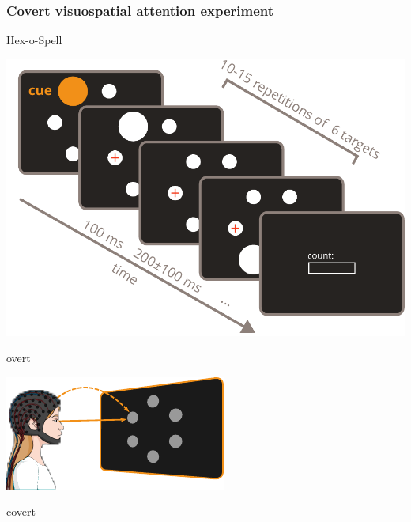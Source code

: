 \documentclass{kul-ulille-beamer}
\begin{document}
\begin{frame}
  \frametitle{Covert visuospatial attention experiment \\
    {\tiny\cite{VanDenKerchove2024}}}
    \centering
    \small


    \hfill
    \begin{minipage}[c]{.25\textwidth}
    
      Hex-o-Spell {\tiny\cite{Treder2010}}
    \end{minipage}\hfill%
    \begin{minipage}[c]{.35\textwidth}
      \includegraphics[width=\textwidth]{figures/covert/timeline.pdf}
    \end{minipage}
    \hfill%
    \bigskip


    \centering
    \begin{minipage}{.6\textwidth}
    \begin{minipage}{.3\textwidth}
      overt
      \smallskip

      \includegraphics[width=\textwidth]{figures/covert/attention_overt.pdf}
    \end{minipage}\hfill%
    \begin{minipage}{.3\textwidth}
      covert
      \smallskip


\end{minipage}
\end{minipage}
\end{frame}
\end{document}

